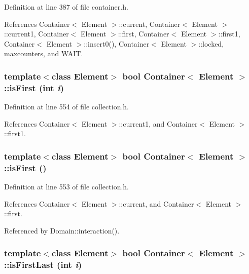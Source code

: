 Definition at line 387 of file container.h.

References Container$<$ Element $>$::current, Container$<$ Element $>$::current1, Container$<$ Element $>$::first, Container$<$ Element $>$::first1, Container$<$ Element $>$::insert0(), Container$<$ Element $>$::locked, maxcounters, and WAIT.\hypertarget{classContainer_22616a14e764ca2d2c45d4412d84039a}{
\subsubsection[{isFirst}]{\setlength{\rightskip}{0pt plus 5cm}template$<$class Element$>$ bool {\bf Container}$<$ Element $>$::isFirst (int {\em i})}}
\label{classContainer_22616a14e764ca2d2c45d4412d84039a}




Definition at line 554 of file collection.h.

References Container$<$ Element $>$::current1, and Container$<$ Element $>$::first1.\hypertarget{classContainer_8d98895b53295450a717e2cfbbce0e6e}{
\subsubsection[{isFirst}]{\setlength{\rightskip}{0pt plus 5cm}template$<$class Element$>$ bool {\bf Container}$<$ Element $>$::isFirst ()}}
\label{classContainer_8d98895b53295450a717e2cfbbce0e6e}




Definition at line 553 of file collection.h.

References Container$<$ Element $>$::current, and Container$<$ Element $>$::first.

Referenced by Domain::interaction().\hypertarget{classContainer_e1a46424973ba9bc31991ecc1eed7acf}{
\subsubsection[{isFirstLast}]{\setlength{\rightskip}{0pt plus 5cm}template$<$class Element$>$ bool {\bf Container}$<$ Element $>$::isFirstLast (int {\em i})}}
\label{classContainer_e1a46424973ba9bc31991ecc1eed7acf}




